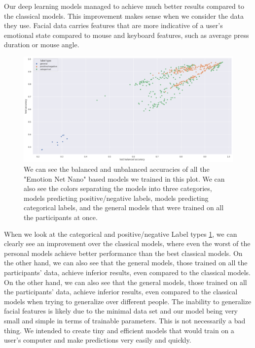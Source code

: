 \documentclass[../main.tex]{subfiles}
\begin{document}
    Our deep learning models managed to achieve much better results compared to the classical models. 
    This improvement makes sense when we consider the data they use. Facial data carries features that are more 
    indicative of a user's emotional state compared to mouse and keyboard features, such as average press duration or mouse angle.

    \begin{figure}[!htp]
        \centering
        \includegraphics[width=14cm]{figures/results/nn_acc}   
        \caption{We can see the balanced and unbalanced accuracies of all the "Emotion Net Nano" based models we trained in this plot.
        We can also see the colors separating the models into three categories, models predicting positive/negative labels, models predicting
        categorical labels, and the general models that were trained on all the participants at once.}
        \label{fig:nn_acc} 
    \end{figure}

    When we look at the categorical and positive/negative Label types \ref{fig:nn_acc}, we can clearly see an improvement over 
    the classical models, where even the worst of the personal models achieve better performance than the best classical models.
    On the other hand, we can also see that the general models, those trained on all the participants' data, achieve inferior results, 
    even compared to the classical models. On the other hand, we can also see that the general models, 
    those trained on all the participants' data, achieve inferior results, even compared to the classical models when trying 
    to generalize over different people. The inability to generalize facial features is likely due to the minimal data 
    set and our model being very small and simple in terms of trainable parameters. This is not necessarily a bad thing. 
    We intended to create tiny and efficient models that would train on a user's computer and make predictions very easily and quickly.
\end{document}
